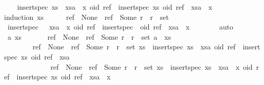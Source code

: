 \begin{isabellebody}
\ \ \isamarkupfalse%
\ {\isachardoublequoteopen}insert{\isacharunderscore}spec\ {\isacharparenleft}xs\ {\isacharat}\ xsa\ {\isacharat}\ {\isacharbrackleft}x{\isacharbrackright}{\isacharparenright}\ {\isacharparenleft}oid{\isacharcomma}\ ref{\isacharparenright}\ {\isacharequal}\ insert{\isacharunderscore}spec\ xs\ {\isacharparenleft}oid{\isacharcomma}\ ref{\isacharparenright}\ {\isacharat}\ xsa\ {\isacharat}\ {\isacharbrackleft}x{\isacharbrackright}{\isachardoublequoteclose}\isanewline
\ \ \isamarkupfalse%
{\isacharparenleft}induction\ xs{\isacharparenright}\isanewline
\ \ \ \ \isamarkupfalse%
\ {\isachardoublequoteopen}ref\ {\isacharequal}\ None\ {\isasymor}\ ref\ {\isacharequal}\ Some\ r\ {\isasymand}\ r\ {\isasymin}\ set\ {\isacharbrackleft}{\isacharbrackright}{\isachardoublequoteclose}\isanewline
\ \ \ \ \isamarkupfalse%
\ {\isachardoublequoteopen}insert{\isacharunderscore}spec\ {\isacharparenleft}{\isacharbrackleft}{\isacharbrackright}\ {\isacharat}\ xsa\ {\isacharat}\ {\isacharbrackleft}x{\isacharbrackright}{\isacharparenright}\ {\isacharparenleft}oid{\isacharcomma}\ ref{\isacharparenright}\ {\isacharequal}\ insert{\isacharunderscore}spec\ {\isacharbrackleft}{\isacharbrackright}\ {\isacharparenleft}oid{\isacharcomma}\ ref{\isacharparenright}\ {\isacharat}\ xsa\ {\isacharat}\ {\isacharbrackleft}x{\isacharbrackright}{\isachardoublequoteclose}\isanewline
\ \ \ \ \ \ \isamarkupfalse%
\ auto\isanewline
\ \ \isamarkupfalse%
\isanewline
\ \ \ \ \isamarkupfalse%
\ a\ xs\isanewline
\ \ \ \ \isamarkupfalse%
\ {}{\isacharcolon}\ {\isachardoublequoteopen}ref\ {\isacharequal}\ None\ {\isasymor}\ ref\ {\isacharequal}\ Some\ r\ {\isasymand}\ r\ {\isasymin}\ set\ {\isacharparenleft}a\ {\isacharhash}\ xs{\isacharparenright}{\isachardoublequoteclose}\isanewline
\ \ \ \ \ \ \ {}{\isacharcolon}\ {\isachardoublequoteopen}{\isacharparenleft}{\isacharparenleft}ref\ {\isacharequal}\ None\ {\isasymor}\ ref\ {\isacharequal}\ Some\ r\ {\isasymand}\ r\ {\isasymin}\ set\ xs\ {\isasymLongrightarrow}\ insert{\isacharunderscore}spec\ {\isacharparenleft}xs\ {\isacharat}\ xsa{\isacharparenright}\ {\isacharparenleft}oid{\isacharcomma}\ ref{\isacharparenright}\ {\isacharequal}\ insert{\isacharunderscore}spec\ xs\ {\isacharparenleft}oid{\isacharcomma}\ ref{\isacharparenright}\ {\isacharat}\ xsa{\isacharparenright}\ {\isasymLongrightarrow}\isanewline
\ \ \ \ \ \ \ \ \ \ \ \ \ ref\ {\isacharequal}\ None\ {\isasymor}\ ref\ {\isacharequal}\ Some\ r\ {\isasymand}\ r\ {\isasymin}\ set\ xs\ {\isasymLongrightarrow}\ insert{\isacharunderscore}spec\ {\isacharparenleft}xs\ {\isacharat}\ xsa\ {\isacharat}\ {\isacharbrackleft}x{\isacharbrackright}{\isacharparenright}\ {\isacharparenleft}oid{\isacharcomma}\ ref{\isacharparenright}\ {\isacharequal}\ insert{\isacharunderscore}spec\ xs\ {\isacharparenleft}oid{\isacharcomma}\ ref{\isacharparenright}\ {\isacharat}\ xsa\ {\isacharat}\ {\isacharbrackleft}x{\isacharbrackright}{\isacharparenright}{\isachardoublequoteclose}\isanewline

\end{isabellebody}
